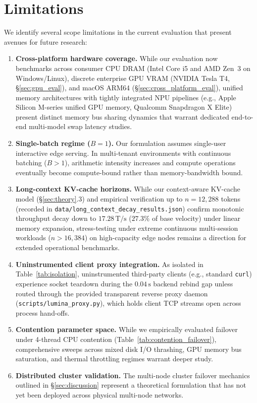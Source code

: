 \documentclass[11pt,a4paper]{article}
\newcommand{\Ts}{\,\mathrm{T/s}}
\newcommand{\su}{\,\mathrm{s}}
\newcommand{\code}[1]{\texttt{#1}}
\begin{document}
\section{Limitations}\label{sec:limits}
We identify several scope limitations in the current evaluation that present avenues for future research:
\begin{enumerate}[leftmargin=*]
\item \textbf{Cross-platform hardware coverage.} While our evaluation now benchmarks across consumer CPU DRAM (Intel Core i5 and AMD Zen~3 on Windows/Linux), discrete enterprise GPU VRAM (NVIDIA Tesla T4, \S\ref{sec:gpu_eval}), and macOS ARM64 (\S\ref{sec:cross_platform_eval}), unified memory architectures with tightly integrated NPU pipelines (e.g., Apple Silicon M-series unified GPU memory, Qualcomm Snapdragon X Elite) present distinct memory bus sharing dynamics that warrant dedicated end-to-end multi-model swap latency studies.
\item \textbf{Single-batch regime ($B=1$).} Our formulation assumes single-user interactive edge serving. In multi-tenant environments with continuous batching ($B > 1$), arithmetic intensity increases and compute operations eventually become compute-bound rather than memory-bandwidth bound.
\item \textbf{Long-context KV-cache horizons.} While our context-aware KV-cache model (\S\ref{sec:theory}.3) and empirical verification up to $n=12{,}288$ tokens (recorded in \code{data/long\_context\_decay\_results.json}) confirm monotonic throughput decay down to $17.28\Ts$ ($27.3\%$ of base velocity) under linear memory expansion, stress-testing under extreme continuous multi-session workloads ($n > 16{,}384$) on high-capacity edge nodes remains a direction for extended operational benchmarks.
\item \textbf{Uninstrumented client proxy integration.} As isolated in Table~\ref{tab:isolation}, uninstrumented third-party clients (e.g., standard \code{curl}) experience socket teardown during the $0.04\su$ backend rebind gap unless routed through the provided transparent reverse proxy daemon (\code{scripts/lumina\_proxy.py}), which holds client TCP streams open across process hand-offs.
\item \textbf{Contention parameter space.} While we empirically evaluated failover under 4-thread CPU contention (Table~\ref{tab:contention_failover}), comprehensive sweeps across mixed disk I/O thrashing, GPU memory bus saturation, and thermal throttling regimes warrant deeper study.
\item \textbf{Distributed cluster validation.} The multi-node cluster failover mechanics outlined in \S\ref{sec:discussion} represent a theoretical formulation that has not yet been deployed across physical multi-node networks.

\end{enumerate}
\end{document}

